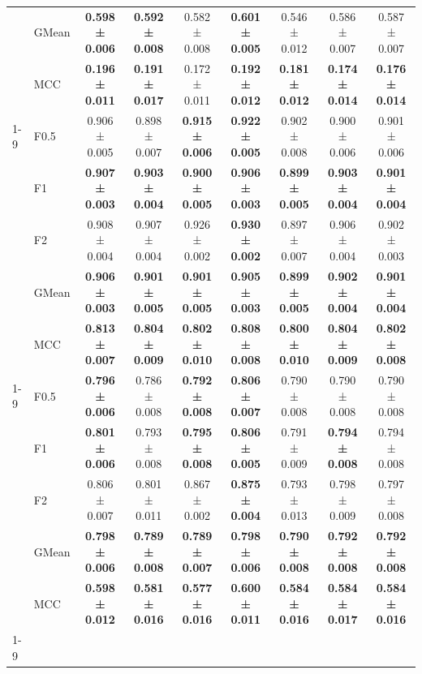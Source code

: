 \begin{table}[H]
{\begin{tabular}{llccccccc}
 & GMean & \textbf{0.598 ± 0.006} & \textbf{0.592 ± 0.008} & 0.582 ± 0.008 & \textbf{0.601 ± 0.005} & 0.546 ± 0.012 & 0.586 ± 0.007 & 0.587 ± 0.007 \\
 & MCC & \textbf{0.196 ± 0.011} & \textbf{0.191 ± 0.017} & 0.172 ± 0.011 & \textbf{0.192 ± 0.012} & \textbf{0.181 ± 0.012} & \textbf{0.174 ± 0.014} & \textbf{0.176 ± 0.014} \\
\cline{1-9}
\multirow[t]{5}{*}{TabPFN} & F0.5 & 0.906 ± 0.005 & 0.898 ± 0.007 & \textbf{0.915 ± 0.006} & \textbf{0.922 ± 0.005} & 0.902 ± 0.008 & 0.900 ± 0.006 & 0.901 ± 0.006 \\
 & F1 & \textbf{0.907 ± 0.003} & \textbf{0.903 ± 0.004} & \textbf{0.900 ± 0.005} & \textbf{0.906 ± 0.003} & \textbf{0.899 ± 0.005} & \textbf{0.903 ± 0.004} & \textbf{0.901 ± 0.004} \\
 & F2 & 0.908 ± 0.004 & 0.907 ± 0.004 & 0.926 ± 0.002 & \textbf{0.930 ± 0.002} & 0.897 ± 0.007 & 0.906 ± 0.004 & 0.902 ± 0.003 \\
 & GMean & \textbf{0.906 ± 0.003} & \textbf{0.901 ± 0.005} & \textbf{0.901 ± 0.005} & \textbf{0.905 ± 0.003} & \textbf{0.899 ± 0.005} & \textbf{0.902 ± 0.004} & \textbf{0.901 ± 0.004} \\
 & MCC & \textbf{0.813 ± 0.007} & \textbf{0.804 ± 0.009} & \textbf{0.802 ± 0.010} & \textbf{0.808 ± 0.008} & \textbf{0.800 ± 0.010} & \textbf{0.804 ± 0.009} & \textbf{0.802 ± 0.008} \\
\cline{1-9}
\multirow[t]{5}{*}{XGBoost} & F0.5 & \textbf{0.796 ± 0.006} & 0.786 ± 0.008 & \textbf{0.792 ± 0.008} & \textbf{0.806 ± 0.007} & 0.790 ± 0.008 & 0.790 ± 0.008 & 0.790 ± 0.008 \\
 & F1 & \textbf{0.801 ± 0.006} & 0.793 ± 0.008 & \textbf{0.795 ± 0.008} & \textbf{0.806 ± 0.005} & 0.791 ± 0.009 & \textbf{0.794 ± 0.008} & 0.794 ± 0.008 \\
 & F2 & 0.806 ± 0.007 & 0.801 ± 0.011 & 0.867 ± 0.002 & \textbf{0.875 ± 0.004} & 0.793 ± 0.013 & 0.798 ± 0.009 & 0.797 ± 0.008 \\
 & GMean & \textbf{0.798 ± 0.006} & \textbf{0.789 ± 0.008} & \textbf{0.789 ± 0.007} & \textbf{0.798 ± 0.006} & \textbf{0.790 ± 0.008} & \textbf{0.792 ± 0.008} & \textbf{0.792 ± 0.008} \\
 & MCC & \textbf{0.598 ± 0.012} & \textbf{0.581 ± 0.016} & \textbf{0.577 ± 0.016} & \textbf{0.600 ± 0.011} & \textbf{0.584 ± 0.016} & \textbf{0.584 ± 0.017} & \textbf{0.584 ± 0.016} \\
\cline{1-9}
\bottomrule
\end{tabular}
    }
\end{table}
